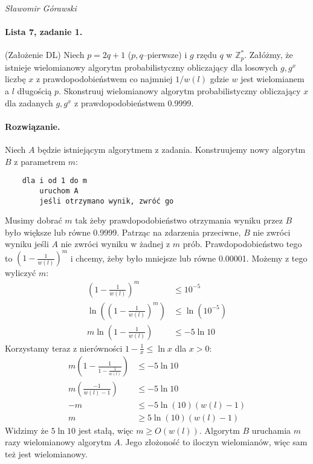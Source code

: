 \documentclass{article}
\begin{document}
\begin{flushright}
\textit{Sławomir Górawski}
\end{flushright}

\paragraph{Lista 7, zadanie 1.}
(Założenie DL) Niech $p = 2q + 1$ ($p, q$–pierwsze) i $g$ rzędu $q$ w $\mathbb{Z}_p^*$.
Załóżmy, że istnieje wielomianowy algorytm probabilistyczny
obliczający dla losowych $g, g^x$ liczbę $x$
z prawdopodobieństwem co najmniej $1/w(l)$
gdzie $w$ jest wielomianem a $l$ długością $p$.
Skonstruuj wielomianowy algorytm probabilistyczny
obliczający $x$ dla zadanych $g, g^x$
z prawdopodobieństwem 0.9999.

\paragraph{Rozwiązanie.}
Niech $A$ będzie istniejącym algorytmem z zadania.
Konstruujemy nowy algorytm $B$ z parametrem $m$:
\begin{verbatim}
    dla i od 1 do m
        uruchom A
        jeśli otrzymano wynik, zwróć go
\end{verbatim}
Musimy dobrać $m$ tak żeby prawdopodobieństwo otrzymania wyniku przez $B$
było większe lub równe 0.9999.
Patrząc na zdarzenia przeciwne,
$B$ nie zwróci wyniku jeśli $A$ nie zwróci wyniku w żadnej z $m$ prób.
Prawdopodobieństwo tego to $(1 - \frac{1}{w(l)})^m$ i chcemy, żeby było mniejsze lub równe 0.00001.
Możemy z tego wyliczyć $m$:
\begin{align*}
    \left( 1 - \frac{1}{w(l)} \right)^m &\le 10^{-5} \\
    \ln \left( \left( 1 - \frac{1}{w(l)} \right)^m \right) &\le \ln(10^{-5}) \\
    m \ln \left( 1 - \frac{1}{w(l)} \right) &\le -5 \ln 10
\end{align*}
Korzystamy teraz z nierówności $1 - \frac{1}{x} \le \ln x$ dla $x > 0$:
\begin{align*}
    m \left( 1 - \frac{1}{1 - \frac{1}{w(l)}} \right) &\le -5 \ln 10 \\
    m \left( \frac{-1}{w(l) - 1} \right) &\le -5 \ln 10 \\
    -m &\le -5 \ln(10)(w(l) - 1) \\
    m &\ge 5 \ln(10)(w(l) - 1)
\end{align*}
Widzimy że $5 \ln 10$ jest stałą, więc $m \ge O(w(l))$.
Algorytm $B$ uruchamia $m$ razy wielomianowy algorytm $A$.
Jego złożoność to iloczyn wielomianów, więc sam też jest wielomianowy.
\end{document}

